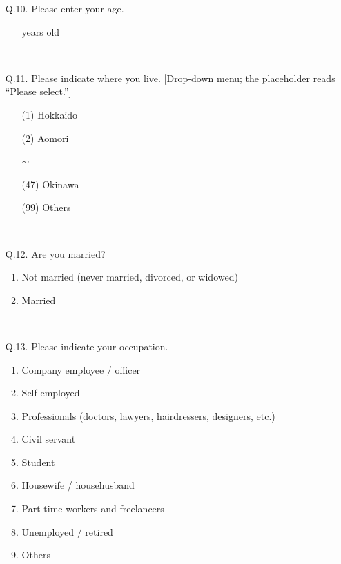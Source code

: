 \documentclass[a4paper,12pt]{article}
\begin{document}
\begin{enumerate}
\

\item[Q.10.] Please enter your age.
	\begin{itemize}
	\item[] \underline{\hspace{30mm}} years old
	\end{itemize}

\

\item[Q.11.] Please indicate where you live. [Drop-down menu; the placeholder reads
``Please select.'']
	\begin{enumerate}[(1)]
	\item[(1)] Hokkaido
	\item[(2)] Aomori
	\item[] $\sim$
	\item[(47)] Okinawa
	\item[(99)] Others
	\end{enumerate}

\

\item[Q.12.] Are you married?
	\begin{enumerate}[(1)]
	\item Not married (never married, divorced, or widowed)
	\item Married
	\end{enumerate}

\

\item[Q.13.] Please indicate your occupation.
	\begin{enumerate}[(1)]
	\item Company employee / officer
	\item Self-employed
	\item Professionals (doctors, lawyers, hairdressers, designers, etc.)
	\item Civil servant
	\item Student
	\item Housewife / househusband
	\item Part-time workers and freelancers
	\item Unemployed / retired
	\item Others
	\end{enumerate}

\


\end{enumerate}
\end{document}
